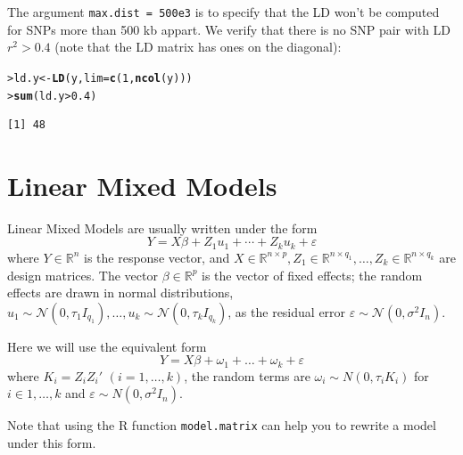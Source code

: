 \documentclass{article}\usepackage[]{graphicx}\usepackage[]{color}
\makeatletter
\newcommand{\hlnum}[1]{\textcolor[rgb]{0.686,0.059,0.569}{#1}}%
\newcommand{\hlopt}[1]{\textcolor[rgb]{0,0,0}{#1}}%
\newcommand{\hlstd}[1]{\textcolor[rgb]{0.345,0.345,0.345}{#1}}%
\newcommand{\hlkwb}[1]{\textcolor[rgb]{0.69,0.353,0.396}{#1}}%
\newcommand{\hlkwc}[1]{\textcolor[rgb]{0.333,0.667,0.333}{#1}}%
\newcommand{\hlkwd}[1]{\textcolor[rgb]{0.737,0.353,0.396}{\textbf{#1}}}%
\newenvironment{kframe}{%
 \def\at@end@of@kframe{}%
 \ifinner\ifhmode%
  \def\at@end@of@kframe{\end{minipage}}%
  \begin{minipage}{\columnwidth}%
 \fi\fi%
 \def\FrameCommand##1{\hskip\@totalleftmargin \hskip-\fboxsep
 \colorbox{shadecolor}{##1}\hskip-\fboxsep
     \hskip-\linewidth \hskip-\@totalleftmargin \hskip\columnwidth}%
 \MakeFramed {\advance\hsize-\width
   \@totalleftmargin\z@ \linewidth\hsize
   \@setminipage}}%
 {\par\unskip\endMakeFramed%
 \at@end@of@kframe}
\newenvironment{knitrout}{}{} %
\let\epsilon\varepsilon
\makeatother
\begin{document}
The argument \verb!max.dist = 500e3! is to specify that the LD won't be computed for
SNPs more than 500 kb appart. We verify that there is no SNP pair with LD $r^2 > 0.4$
(note that the LD matrix has ones on the diagonal):

\begin{knitrout}
\color{fgcolor}\begin{kframe}
\begin{alltt}
\hlstd{> }\hlstd{ld.y} \hlkwb{<-} \hlkwd{LD}\hlstd{( y,} \hlkwc{lim} \hlstd{=} \hlkwd{c}\hlstd{(}\hlnum{1}\hlstd{,} \hlkwd{ncol}\hlstd{(y)) )}
\hlstd{> }\hlkwd{sum}\hlstd{( ld.y} \hlopt{>} \hlnum{0.4} \hlstd{)}
\end{alltt}
\begin{verbatim}
[1] 48
\end{verbatim}
\end{kframe}
\end{knitrout}

\vfill\eject
\section{Linear Mixed Models}

\def\R{\mathbb{R}}
\def\N{\mathcal{N}}

  Linear Mixed Models are usually written under the form
  \begin{equation*}
    Y = X\beta + Z_1 u_1 + \cdots + Z_k u_k + \varepsilon
  \end{equation*}
  where $Y \in\R^{n}$ is the response vector, and $X\in \R^{n\times p}, Z_1 \in \R^{n\times q_1}, \dots, Z_k \in\R^{n\times q_k}$ are
  design matrices. The vector $\beta\in\R^p$ is the vector of fixed effects; the random effects are drawn in 
  normal distributions, $u_1\sim \N(0, \tau_1 I_{q_1}), \dots, u_k\sim \N(0, \tau_k I_{q_k})$, as the residual
  error $\epsilon\sim\N(0,\sigma^2 I_n)$.

  Here we will use the equivalent form 
  \begin{equation*}
    Y = X\beta + \omega_1 + \ldots + \omega_k + \varepsilon
  \end{equation*}
  where $K_i = Z_i Z_i'$ $(i = 1, \dots, k)$,
  the random terms are $\omega_i \sim N(0,\tau_i K_i)$ for $i \in 1, \dots,k$ and $\varepsilon \sim N(0,\sigma^2 I_n)$.

  Note that using the R function \verb!model.matrix! can help you to rewrite a model under this form.
\end{document}
